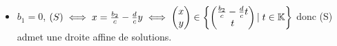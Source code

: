 \documentclass{article}
\begin{document}
\begin{question_kholle}
\begin{itemize}[label=$\bullet$ Supposons]
\begin{itemize}[label=$\bullet$ Si]
\begin{itemize}[label=$\bullet$ Si]
                    \item $b_1 = 0$, $(S) \iff x = \frac{b_2}{c} - \frac{d}{c}y \iff \begin{pmatrix} x \\ y \end{pmatrix} \in \begin{Bmatrix} \begin{pmatrix} \frac{b_2}{c} - \frac{d}{c}t \\ t \end{pmatrix} |\; t \in \mathbb K \end{Bmatrix}$ donc (S) admet une droite affine de solutions.
                  \end{itemize}
          \end{itemize}
  \end{itemize}

\end{question_kholle}
\end{document}
